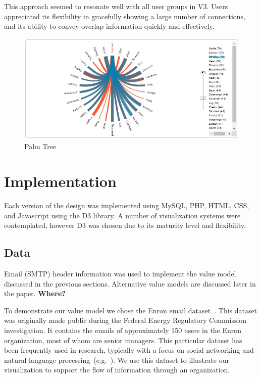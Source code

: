 \documentclass[journal]{vgtc}                %
\begin{document}
This approach seemed to resonate well with all user groups in V3.  Users appreciated its flexibility in gracefully showing a large number of connections, and its ability to convey overlap information quickly and effectively. 

\begin{figure}
	\centering
	\includegraphics[width=\columnwidth]{pictures/palmtree.jpg}
	\caption{Palm Tree}
	\label{fig:palm}
\end{figure}

\section{Implementation}
\label{sec:implementation}
Each version of the design was implemented using MySQL, PHP, HTML, CSS, and Javascript using the D3 library.  A number of visualization systems were contemplated, however D3 was chosen due to its maturity level and flexibility.

\subsection{Data}
Email (SMTP) header information was used to implement the value model discussed in the previous sections.  Alternative value models are discussed later in the paper. \textbf{{\color{Plum}Where?}}

To demonstrate our value model we chose the Enron email dataset~\cite{cmuenron,klimt2004introducing}. This dataset was originally made public during the Federal Energy Regulatory Commission investigation.  It contains the emails of approximately 150 users in the Enron organization, most of whom are senior managers.  This particular dataset has been frequently used in research, typically with a focus on social networking and natural language processing~(e.g.~\cite{diesner2005exploration}). We use this dataset to illustrate our visualization to support the flow of information through an organization.  
\end{document}
